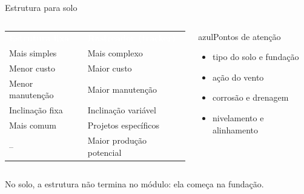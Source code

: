 \documentclass[aspectratio=169,10pt,xcolor=table]{beamer}
\newcommand{\frase}[1]{\vspace{0.1em}\begin{destaque}#1\end{destaque}}
\newcommand{\cabecalho}{\rowcolor{azul}}
\newcommand{\tcab}[1]{\textcolor{white}{\bfseries #1}}
\begin{document}
\begin{frame}{Estrutura para solo}
  \begin{columns}[c]
    \begin{column}{0.55\textwidth}
      \small
      \renewcommand{\arraystretch}{1.5}
      \begin{tabular}{L{3.2cm} L{3.4cm}}
        \cabecalho \tcab{Estrutura fixa} & \tcab{Rastreador (tracker)}\\
        Mais simples & Mais complexo\\
        Menor custo & Maior custo\\
        Menor manutenção & Maior manutenção\\
        Inclinação fixa & Inclinação variável\\
        Mais comum & Projetos específicos\\
        \textcolor{cinza}{--} & Maior produção potencial\\
      \end{tabular}
    \end{column}
    \begin{column}{0.4\textwidth}
      \begin{card}{azul}{\faMountain\enspace Pontos de atenção}
        \begin{itemize}
          \item tipo do solo e fundação
          \item ação do vento
          \item corrosão e drenagem
          \item nivelamento e alinhamento
        \end{itemize}
      \end{card}
    \end{column}
  \end{columns}
  \frase{No solo, a estrutura não termina no módulo: ela começa na fundação.}
\end{frame}
\end{document}
